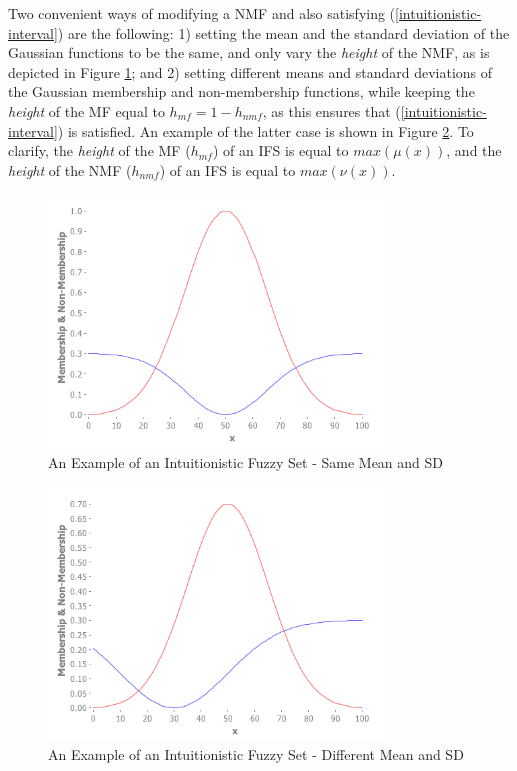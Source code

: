 \documentclass[conference]{IEEEtran}
\begin{document}
Two convenient ways of modifying a NMF and also
satisfying (\ref{intuitionistic-interval}) are the following: 1) setting
the mean and the standard deviation of the Gaussian functions to be
the same, and only vary the \textit{height} of the NMF,
as is depicted in Figure \ref{ifs}; and 2) setting different means and
standard deviations of the Gaussian membership and non-membership
functions, while keeping the \textit{height} of the MF equal
to $h_{mf} = 1 - h_{nmf}$, as this ensures that
(\ref{intuitionistic-interval}) is satisfied. An example of the latter
case is shown in Figure \ref{ifs-diff-mu-sd}. To clarify, the \textit{height}
of the MF ($h_{mf}$) of an IFS is equal to $max(\mu(x))$, and the
\textit{height} of the NMF ($h_{nmf}$) of an IFS is equal to $max(\nu(x))$.

\begin{figure}[!t]
  \centering
  \includegraphics[width=3.5in]{ifs}
  \caption{An Example of an Intuitionistic Fuzzy Set - Same Mean and SD}
  \label{ifs}
\end{figure}

\begin{figure}[!t]
  \centering
  \includegraphics[width=3.5in]{ifs-diff-mu-sd}
  \caption{An Example of an Intuitionistic Fuzzy Set - Different Mean
    and SD}
  \label{ifs-diff-mu-sd}
\end{figure}
\end{document}
